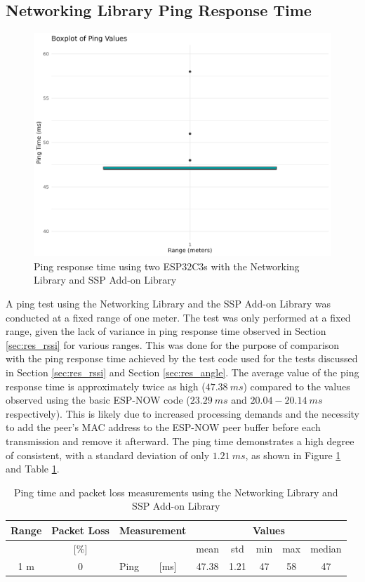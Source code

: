\subsection{\label{sec:res_ping}Networking Library Ping Response Time}

 \begin{figure}[H]
     \centering
     \includegraphics[width=.45\textwidth]{rstudio/analysis/plots/ping_net_ping.png}
     \vspace{\ftspace}
     \caption{Ping response time using two ESP32C3s with the Networking Library and SSP Add-on Library}
     \label{fig:net_ping}
 \end{figure}

A ping test using the Networking Library and the SSP Add-on Library was conducted at a fixed range of one meter. The test was only performed at a fixed range, given the lack of variance in ping response time observed in Section \ref{sec:res_rssi} for various ranges. This was done for the purpose of comparison with the ping response time achieved by the test code used for the tests discussed in Section \ref{sec:res_rssi} and Section \ref{sec:res_angle}. The average value of the ping response time is approximately twice as high ($47.38\ ms$) compared to the values observed using the basic ESP-NOW code ($23.29\ ms$ and $20.04-20.14\ ms$ respectively). This is likely due to increased processing demands and the necessity to add the peer's MAC address to the ESP-NOW peer buffer before each transmission and remove it afterward. The ping time demonstrates a high degree of consistent, with a standard deviation of only $1.21\ ms$, as shown in Figure \ref{fig:net_ping} and Table \ref{tab:ping}. 

\begin{table}[H]
    \centering
    \begin{tabular}{|c|c|l|l|c|c|c|c|c|}
    \hline
        Range & Packet Loss & \multicolumn{2}{l|}{Measurement} & \multicolumn{5}{c|}{Values} \\\hline
        [meters] & [\%] & \multicolumn{2}{l|}{} & mean & std & min & max & median \\\hline\hline
        1 m & 0 & Ping & [ms] & 47.38 & 1.21 & 47 & 58 & 47 \\\hline
    \end{tabular}
    \vspace{\ftspace}
    \caption{Ping time and packet loss measurements using the Networking Library and SSP Add-on Library}
    \label{tab:ping}
\end{table}

